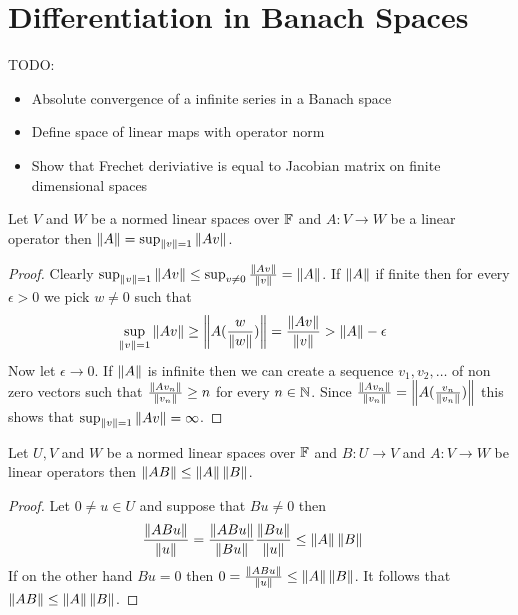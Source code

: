 \section{Differentiation in Banach Spaces}

TODO:
\begin{itemize}
\item Absolute convergence of a infinite series in a Banach space
\item Define space of linear maps with operator norm
\item Show that Frechet deriviative is equal to Jacobian matrix on
  finite dimensional spaces
\end{itemize}

\begin{prop}\label{banach:OperatorNormAlternative}Let $V$ and $W$ be a normed linear spaces over $\mathbb{F}$ and $A : V \to W$ be a linear operator then $\left \lVert A \right \rVert = \sup_{\left \lVert v \right \rVert =1} \left \lVert Av \right \rVert$.
\end{prop}
\begin{proof}
Clearly $\sup_{\left \lVert v \right \rVert =1} \left \lVert Av \right \rVert \leq \sup_{v \neq 0} \frac{\left \lVert Av \right \rVert}{\left \lVert v \right \rVert} =\left \lVert A \right \rVert$.  If $\left \lVert A \right \rVert$ if finite then for every $\epsilon>0$ we pick $w \neq 0$ such that 
\begin{align*}
\sup_{\left \lVert v \right \rVert =1} \left \lVert Av \right \rVert &\geq \left \lVert A(\frac{w}{\left \lVert w \right \rVert}) \right \rVert = \frac{\left \lVert Av \right \rVert}{\left \lVert v \right \rVert} > \left \lVert A \right \rVert - \epsilon
\end{align*}
Now let $\epsilon \to 0$.  If $\left \lVert A \right \rVert$ is infinite then we can create a sequence $v_1, v_2, \dotsc$ of non zero vectors such that $\frac{\left \lVert Av_n \right \rVert}{\left \lVert v_n \right \rVert} \geq n$ for every $n \in \mathbb{N}$.  Since $\frac{\left \lVert Av_n \right \rVert}{\left \lVert v_n \right \rVert} = \left \lVert A(\frac{v_n}{\left \lVert v_n \right \rVert}) \right \rVert$ this shows that $\sup_{\left \lVert v \right \rVert =1} \left \lVert Av \right \rVert = \infty$.
\end{proof}

\begin{prop}\label{banach:OperatorNormInequality}Let $U, V$ and $W$ be a normed linear spaces over $\mathbb{F}$ and $B : U \to V$ and $A : V \to W$ be linear operators then $\left \lVert AB \right \rVert \leq \left \lVert A \right \rVert\left \lVert B \right \rVert$.
\end{prop}
\begin{proof}
Let $0 \neq u \in U$ and suppose that $B u \neq 0$ then 
\begin{align*}
\frac{\left \lVert AB u \right \rVert}{\left \lVert u \right \rVert}  &= \frac{\left \lVert AB u \right \rVert}{\left \lVert Bu \right \rVert} \frac{\left \lVert Bu \right \rVert}{\left \lVert u \right \rVert} \leq \left \lVert A \right \rVert \left \lVert B \right \rVert
\end{align*}
If on the other hand $B u = 0$ then $0 = \frac{\left \lVert AB u \right \rVert}{\left \lVert u \right \rVert}  \leq \left \lVert A \right \rVert \left \lVert B \right \rVert$.  It follows that $\left \lVert AB \right \rVert \leq \left \lVert A \right \rVert\left \lVert B \right \rVert$.
\end{proof}

